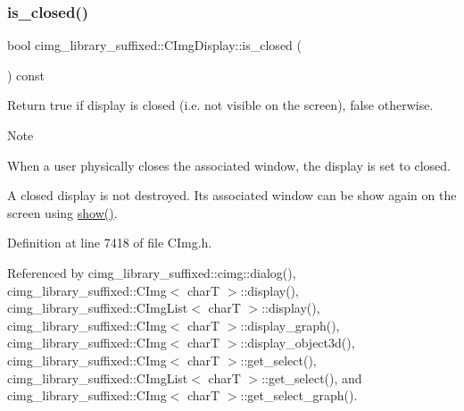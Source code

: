 \subsubsection{\texorpdfstring{is\+\_\+closed()}{is\_closed()}}
{\footnotesize\ttfamily bool cimg\+\_\+library\+\_\+suffixed\+::\+C\+Img\+Display\+::is\+\_\+closed (\begin{DoxyParamCaption}{ }\end{DoxyParamCaption}) const\hspace{0.3cm}{\ttfamily [inline]}}



Return {\ttfamily true} if display is closed (i.\+e. not visible on the screen), {\ttfamily false} otherwise. 

\begin{DoxyNote}{Note}

\begin{DoxyItemize}
\item When a user physically closes the associated window, the display is set to closed.
\item A closed display is not destroyed. Its associated window can be show again on the screen using \hyperlink{structcimg__library__suffixed_1_1CImgDisplay_a40569e73fec12daeec84942b0d0f1b6d}{show()}. 
\end{DoxyItemize}
\end{DoxyNote}


Definition at line 7418 of file C\+Img.\+h.



Referenced by cimg\+\_\+library\+\_\+suffixed\+::cimg\+::dialog(), cimg\+\_\+library\+\_\+suffixed\+::\+C\+Img$<$ char\+T $>$\+::display(), cimg\+\_\+library\+\_\+suffixed\+::\+C\+Img\+List$<$ char\+T $>$\+::display(), cimg\+\_\+library\+\_\+suffixed\+::\+C\+Img$<$ char\+T $>$\+::display\+\_\+graph(), cimg\+\_\+library\+\_\+suffixed\+::\+C\+Img$<$ char\+T $>$\+::display\+\_\+object3d(), cimg\+\_\+library\+\_\+suffixed\+::\+C\+Img$<$ char\+T $>$\+::get\+\_\+select(), cimg\+\_\+library\+\_\+suffixed\+::\+C\+Img\+List$<$ char\+T $>$\+::get\+\_\+select(), and cimg\+\_\+library\+\_\+suffixed\+::\+C\+Img$<$ char\+T $>$\+::get\+\_\+select\+\_\+graph().

